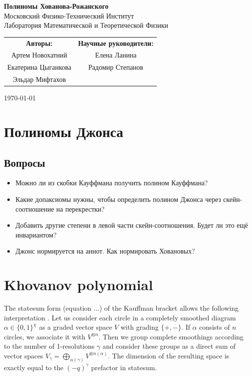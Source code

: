 \documentclass[12pt,a4paper]{article}
\begin{document}
\begin{center}
    \Large \textbf{Полиномы Хованова-Рожанского} \\[1em]
    \small
    Московский Физико-Технический Институт \\[0.5em]
    Лаборатория Математической и Теоретической Физики
\end{center}

\small
\begin{flushright}
\begin{tabular}{c c}
\textbf{Авторы:} & \textbf{Научные руководители:} \\[0.5em]
Артем Новохатний & Елена Ланина \\
Екатерина Цыганкова & Радомир Степанов \\
Эльдар Мифтахов & \\
\end{tabular}

\vspace{1em}

\today
\end{flushright}
\normalsize
\vspace{2em}


\tableofcontents
\vspace{2em}

\section{Полиномы Джонса}

\subsection{Вопросы}
\begin{itemize}
    \item  Можно ли из скобки Кауффмана получить полином Кауффмана?
    \item  Какие допаксиомы нужны, чтобы определить полином Джонса через скейн-соотношение на перекрестки?
    \item  Добавить другие степени в левой части скейн-соотношения. Будет ли это ещё инвариантом?
    \item Джонс нормируется на аннот. Как нормировать Ховановых?
\end{itemize}

\section{Khovanov polynomial}
The statesum form (equation ...) of the Kauffman bracket allows the following interpretation \parencite{bar-natan}. Let us consider each circle in a completely smoothed diagram $\alpha \in \{0, 1\}^\chi$ as a graded vector space $V$ with grading $\{+, -\}$.  If $\alpha$ consists of $n$ circles, we associate it with $V^{\otimes n}$. Then we group complete smoothings according to the number of 1-resolutions $\gamma$ and consider these groups as a direct sum of vector spaces $V_\gamma = \bigoplus\limits_{\alpha(\gamma)} V^{\otimes n(\alpha)}$. The dimension of the resulting space is exactly equal to the $(-q)^\gamma$ prefactor in statesum.
\end{document}

